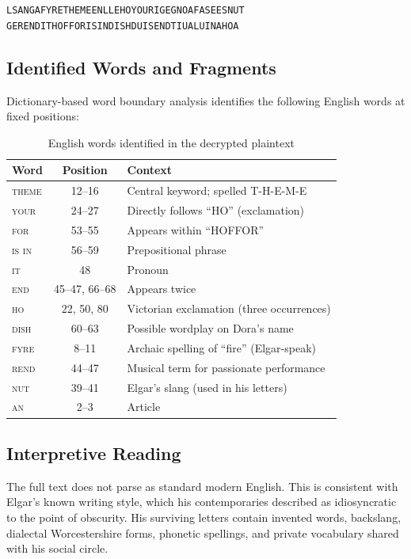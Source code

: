 \documentclass[12pt,a4paper]{article}
\begin{document}
\begin{center}
\texttt{LSANGAFYRETHEMEENLLEHOYOURIGEGNOAFASEESNUT}\\[2pt]
\texttt{GERENDITHOFFORISINDISHDUISENDTIUALUINAHOA}
\end{center}

\subsection{Identified Words and Fragments}

Dictionary-based word boundary analysis identifies the following English words at fixed positions:

\begin{table}[H]
\centering
\caption{English words identified in the decrypted plaintext}
\label{tab:words}
\begin{tabular}{lcl}
\toprule
\textbf{Word} & \textbf{Position} & \textbf{Context}\\
\midrule
\textsc{theme} & 12--16 & Central keyword; spelled T-H-E-M-E\\
\textsc{your} & 24--27 & Directly follows ``HO'' (exclamation)\\
\textsc{for} & 53--55 & Appears within ``HOFFOR'' \\
\textsc{is in} & 56--59 & Prepositional phrase\\
\textsc{it} & 48 & Pronoun\\
\textsc{end} & 45--47, 66--68 & Appears twice\\
\textsc{ho} & 22, 50, 80 & Victorian exclamation (three occurrences)\\
\textsc{dish} & 60--63 & Possible wordplay on Dora's name\\
\textsc{fyre} & 8--11 & Archaic spelling of ``fire'' (Elgar-speak)\\
\textsc{rend} & 44--47 & Musical term for passionate performance\\
\textsc{nut} & 39--41 & Elgar's slang (used in his letters)\\
\textsc{an} & 2--3 & Article\\
\bottomrule
\end{tabular}
\end{table}

\subsection{Interpretive Reading}

The full text does not parse as standard modern English. This is consistent with Elgar's known writing style, which his contemporaries described as idiosyncratic to the point of obscurity. His surviving letters contain invented words, backslang, dialectal Worcestershire forms, phonetic spellings, and private vocabulary shared with his social circle.
\end{document}
